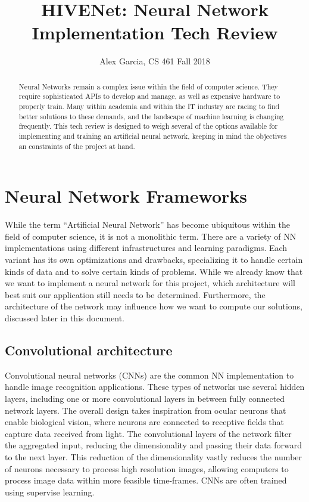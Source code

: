 \documentclass[onecolumn, draftclsnofoot,10pt, compsoc]{IEEEtran}
\title{HIVENet: Neural Network Implementation Tech Review}
\author{Alex Garcia, CS 461 Fall 2018}
\begin{document}
\begin{titlepage}
\maketitle
    \begin{abstract}
    Neural Networks remain a complex issue within the field of computer science. They require sophisticated APIs to develop and manage, as well as expensive hardware to properly train. Many within academia and within the IT industry are racing to find better solutions to these demands, and the landscape of machine learning is changing frequently. This tech review is designed to weigh several of the options available for implementing and training an artificial neural network, keeping in mind the objectives an constraints of the project at hand.
    \end{abstract}
\end{titlepage}

    \section{Neural Network Frameworks}
    While the term “Artificial Neural Network” has become ubiquitous within the field of computer science, it is not a monolithic term. There are a variety of NN implementations using different infrastructures and learning paradigms. Each variant has its own optimizations and drawbacks, specializing it to handle certain kinds of data and to solve certain kinds of problems. While we already know that we want to implement a neural network for this project, which architecture will best suit our application still needs to be determined. Furthermore, the architecture of the network may influence how we want to compute our solutions, discussed later in this document.
    \subsection{Convolutional architecture}
    Convolutional neural networks (CNNs) are the common NN implementation to handle image recognition applications. These types of networks use several hidden layers, including one or more convolutional layers in between fully connected network layers. The overall design takes inspiration from ocular neurons that enable biological vision, where neurons are connected to receptive fields that capture data received from light. The convolutional layers of the network filter the aggregated input, reducing the dimensionality and passing their data forward to the next layer. This reduction of the dimensionality vastly reduces the number of neurons necessary to process high resolution images, allowing computers to process image data within more feasible time-frames. CNNs are often trained using supervise learning.
\end{document}
